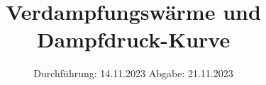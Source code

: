 

\subject{V203}
\title{Verdampfungswärme und Dampfdruck-Kurve}
\date{%
  Durchführung: 14.11.2023
  \hspace{3em}
  Abgabe: 21.11.2023
}



\maketitle
\thispagestyle{empty}
\tableofcontents
\newpage






\printbibliography{}


